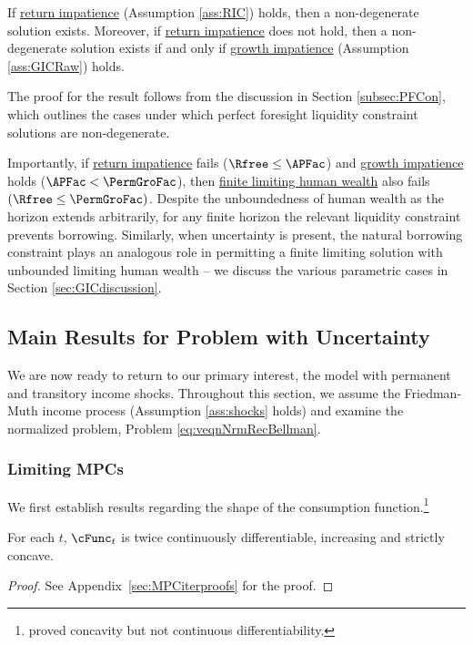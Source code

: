 \documentclass[BufferStockTheory]{subfiles}
\begin{document}
\begin{proposition}\label{prop:PFCExist}
 If \hyperlink{RIC}{return impatience} (Assumption \ref{ass:RIC}) holds, then a non-degenerate solution exists. Moreover, if \hyperlink{RIC}{return impatience} does not hold, then a non-degenerate solution exists if and only if \hyperlink{GICRaw}{growth impatience} (Assumption \ref{ass:GICRaw}) holds. 
\end{proposition}

The proof for the result follows from the discussion in Section \ref{subsec:PFCon}, which outlines the cases under which perfect foresight liquidity constraint solutions are non-degenerate.

Importantly, if \hyperlink{RIC}{return impatience} fails ($\Rfree\leq \APFac$) and \hyperlink{GIC}{growth impatience} holds ($\APFac<\PermGroFac$), then \hyperlink{FHWC}{finite limiting  human wealth} also fails $(\Rfree \leq \PermGroFac)$.
Despite the unboundedness of human wealth as the horizon extends arbitrarily, for any finite horizon the relevant liquidity constraint prevents borrowing.
Similarly, when uncertainty is present, the natural borrowing constraint plays an analogous role in permitting a finite limiting solution with unbounded limiting human wealth -- we discuss the various parametric cases in Section \ref{sec:GICdiscussion}.


\hypertarget{limsolexists}{}
\subsection{Main Results for Problem with Uncertainty}\label{subsec:limSolExists}

We are now ready to return to our primary interest, the model with permanent and transitory income shocks.
Throughout this section, we assume the Friedman-Muth income process (Assumption \ref{ass:shocks} holds) and examine the normalized problem, Problem \ref{eq:veqnNrmRecBellman}.



\subsubsection{Limiting MPCs}\label{subsubsec:cFuncBounds}

We first establish results regarding the shape of the consumption function.\footnote{\cite{ckConcavity} proved concavity but not continuous differentiability.}

\begin{proposition} \label{prop:cfuncprop} For each $t$, $\cFunc_{t}$ is twice continuously differentiable, increasing and strictly concave.
\end{proposition}
\begin{proof}\let\qed\relax
See Appendix~\ref{sec:MPCiterproofs} for the proof.

\end{proof}
\end{document}
